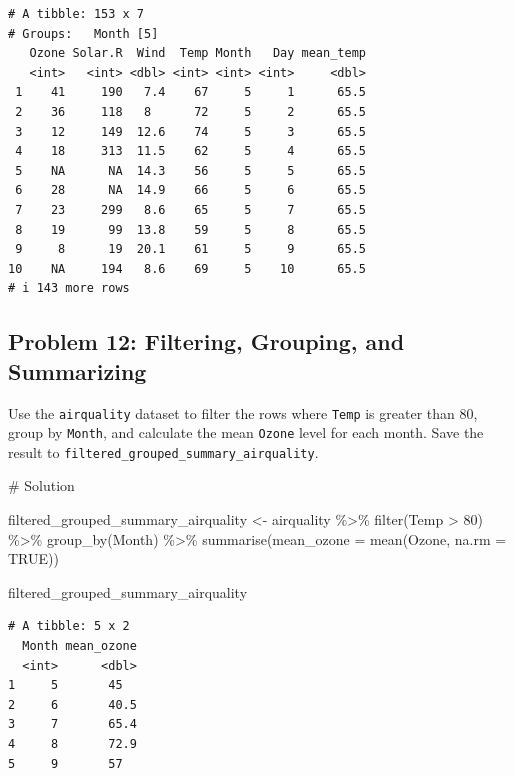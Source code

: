 \documentclass[
  letterpaper,
  DIV=11,
  numbers=noendperiod]{scrreprt}
\newenvironment{Shaded}{\begin{snugshade}}{\end{snugshade}}
\newcommand{\AttributeTok}[1]{\textcolor[rgb]{0.40,0.45,0.13}{#1}}
\newcommand{\CommentTok}[1]{\textcolor[rgb]{0.37,0.37,0.37}{#1}}
\newcommand{\ConstantTok}[1]{\textcolor[rgb]{0.56,0.35,0.01}{#1}}
\newcommand{\DecValTok}[1]{\textcolor[rgb]{0.68,0.00,0.00}{#1}}
\newcommand{\FunctionTok}[1]{\textcolor[rgb]{0.28,0.35,0.67}{#1}}
\newcommand{\NormalTok}[1]{\textcolor[rgb]{0.00,0.23,0.31}{#1}}
\newcommand{\OtherTok}[1]{\textcolor[rgb]{0.00,0.23,0.31}{#1}}
\newcommand{\SpecialCharTok}[1]{\textcolor[rgb]{0.37,0.37,0.37}{#1}}
\begin{document}
\begin{verbatim}
# A tibble: 153 x 7
# Groups:   Month [5]
   Ozone Solar.R  Wind  Temp Month   Day mean_temp
   <int>   <int> <dbl> <int> <int> <int>     <dbl>
 1    41     190   7.4    67     5     1      65.5
 2    36     118   8      72     5     2      65.5
 3    12     149  12.6    74     5     3      65.5
 4    18     313  11.5    62     5     4      65.5
 5    NA      NA  14.3    56     5     5      65.5
 6    28      NA  14.9    66     5     6      65.5
 7    23     299   8.6    65     5     7      65.5
 8    19      99  13.8    59     5     8      65.5
 9     8      19  20.1    61     5     9      65.5
10    NA     194   8.6    69     5    10      65.5
# i 143 more rows
\end{verbatim}

\subsection*{Problem 12: Filtering, Grouping, and
Summarizing}\label{problem-12-filtering-grouping-and-summarizing}

Use the \texttt{airquality} dataset to filter the rows where
\texttt{Temp} is greater than 80, group by \texttt{Month}, and calculate
the mean \texttt{Ozone} level for each month. Save the result to
\texttt{filtered\_grouped\_summary\_airquality}.

\begin{Shaded}
\begin{Highlighting}[]
\CommentTok{\# Solution}

\NormalTok{filtered\_grouped\_summary\_airquality }\OtherTok{\textless{}{-}}\NormalTok{ airquality }\SpecialCharTok{\%\textgreater{}\%}
  \FunctionTok{filter}\NormalTok{(Temp }\SpecialCharTok{\textgreater{}} \DecValTok{80}\NormalTok{) }\SpecialCharTok{\%\textgreater{}\%}
  \FunctionTok{group\_by}\NormalTok{(Month) }\SpecialCharTok{\%\textgreater{}\%}
  \FunctionTok{summarise}\NormalTok{(}\AttributeTok{mean\_ozone =} \FunctionTok{mean}\NormalTok{(Ozone, }\AttributeTok{na.rm =} \ConstantTok{TRUE}\NormalTok{))}

\NormalTok{filtered\_grouped\_summary\_airquality}
\end{Highlighting}
\end{Shaded}

\begin{verbatim}
# A tibble: 5 x 2
  Month mean_ozone
  <int>      <dbl>
1     5       45  
2     6       40.5
3     7       65.4
4     8       72.9
5     9       57  
\end{verbatim}
\end{document}
